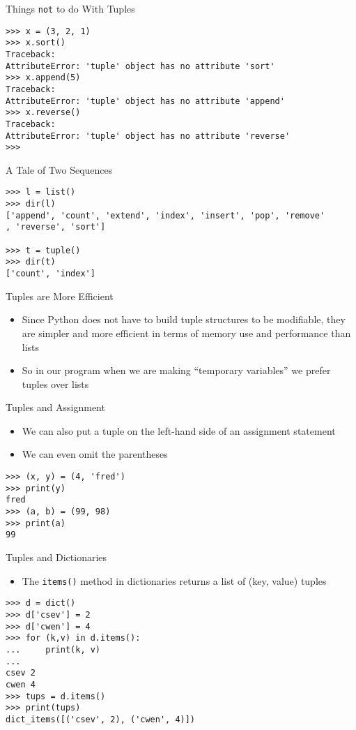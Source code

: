 \documentclass[serif, aspectratio=169]{beamer}
\begin{document}
\begin{frame}[fragile]{Things \texttt{\color{red}not} to do With Tuples}
    \begin{lstlisting}
>>> x = (3, 2, 1)
>>> x.sort()
Traceback:
AttributeError: 'tuple' object has no attribute 'sort'
>>> x.append(5)
Traceback:
AttributeError: 'tuple' object has no attribute 'append'
>>> x.reverse()
Traceback:
AttributeError: 'tuple' object has no attribute 'reverse'
>>> 
    \end{lstlisting}
\end{frame}


\begin{frame}[fragile]{A Tale of Two Sequences}
    \begin{lstlisting}
>>> l = list()
>>> dir(l)
['append', 'count', 'extend', 'index', 'insert', 'pop', 'remove'
, 'reverse', 'sort']

>>> t = tuple()
>>> dir(t)
['count', 'index']	
    \end{lstlisting}
\end{frame}

\begin{frame}{Tuples are More Efficient}
	\begin{itemize}
		\item Since Python does not have to build tuple structures to be modifiable, they are simpler and more efficient in terms of memory use and performance than lists
		\item So in our program when we are making “temporary variables” we prefer tuples over lists
		
	\end{itemize}
\end{frame}

\begin{frame}[fragile]{Tuples and Assignment}
	\begin{itemize}
		\item We can also put a tuple on the left-hand side of an assignment statement
		\item We can even omit the parentheses
	\end{itemize}
	\begin{lstlisting}
>>> (x, y) = (4, 'fred')
>>> print(y)
fred
>>> (a, b) = (99, 98)
>>> print(a)
99
\end{lstlisting}
\end{frame}

\begin{frame}[fragile]{Tuples and Dictionaries}
	\begin{itemize}
		\item The \texttt{\color{red}items()} method in dictionaries returns a list of (key, value) tuples
	\end{itemize}
    \begin{lstlisting}
>>> d = dict()
>>> d['csev'] = 2
>>> d['cwen'] = 4
>>> for (k,v) in d.items(): 
...     print(k, v)
...
csev 2
cwen 4
>>> tups = d.items()
>>> print(tups)
dict_items([('csev', 2), ('cwen', 4)])
    \end{lstlisting}
\end{frame}
\end{document}
